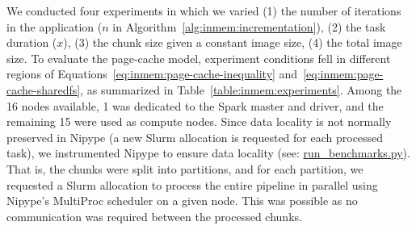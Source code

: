 We conducted four experiments in which we varied (1) the number of iterations in
the application ($n$ in Algorithm~\ref{alg:inmem:incrementation}), (2) the
task duration ($x$), (3) the chunk size given a constant image size, (4) the
total image size. To evaluate the page-cache model, experiment conditions fell
in different regions of Equations~\ref{eq:inmem:page-cache-inequality}
and~\ref{eq:inmem:page-cache-sharedfs}, as summarized in
Table~\ref{table:inmem:experiments}. Among the 16 nodes available, 1 was dedicated to
the Spark master and driver, and the remaining 15 were used as compute nodes.
Since data locality is not normally preserved in Nipype (a new Slurm allocation
is requested for each processed task), we instrumented Nipype to ensure data
locality (see:
\href{https://github.com/big-data-lab-team/paper-in-mem-locality/blob/master/benchmark\_scripts/run\_benchmarks.py}{run\_benchmarks.py}).
That is, the chunks were split into partitions, and for each partition, we
requested a Slurm allocation to process the entire pipeline in parallel using
Nipype's MultiProc scheduler on a given node. This was possible as no
communication was required between the processed chunks.

